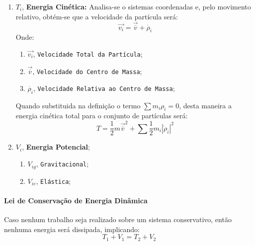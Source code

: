 \documentclass{article}
\begin{document}
                \begin{enumerate}[rightmargin = \leftmargin, noitemsep]
                    \item $T_{i}$, \textbf{Energia Cinética:} Analisa-se o sistemas coordenadas e, pelo movimento relativo, obtém-se que a velocidade da partícula será:
                        \begin{equation}
                            \vec{v_{i}} = \vec{\overline{v}} + \dot{\rho_{i}}
                        \end{equation}
                    Onde:
                        \begin{enumerate}[noitemsep]
                            \item $\vec{v_{i}}$, \texttt{Velocidade Total da Partícula};
                            \item $\vec{\overline{v}}$, \texttt{Velocidade do Centro de Massa};
                            \item $\dot{\rho_{i}}$, \texttt{Velocidade Relativa ao Centro de Massa};
                        \end{enumerate}
                    Quando substituida na definição o termo $\sum m_{i}\rho_{i} = 0$, desta maneira a energia cinética total para o conjunto de partículas será:
                        \begin{equation}
                            \boxed{
                                T = \frac{1}{2} m \vec{\overline{v}}^{2} + \sum \frac{1}{2} m_{i} |\dot{\rho}_{i}|^{2}
                            }
                        \end{equation}
                    \item $V_{i}$, \textbf{Energia Potencial};
                        \begin{enumerate}[noitemsep]
                            \item $V_{ig}$, \texttt{Gravitacional};
                            \item $V_{ie}$, \texttt{Elástica};
                        \end{enumerate}
                \end{enumerate}

            \paragraph{Lei de Conservação de Energia Dinâmica}Caso nenhum trabalho seja realizado sobre um sistema conservativo, então nenhuma energia será dissipada, implicando:
                \begin{equation}
                    \boxed{
                        T_{1} + V_{1} = T_{2} + V_{2}
                    }
                \end{equation}
\end{document}
